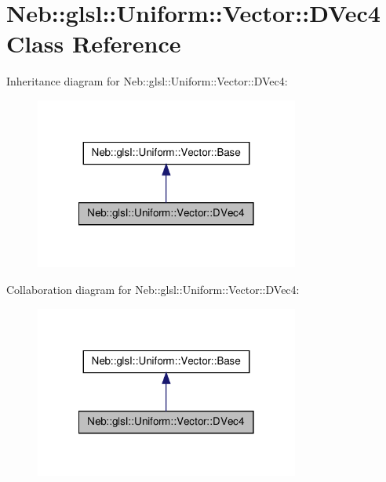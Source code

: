 \hypertarget{classNeb_1_1glsl_1_1Uniform_1_1Vector_1_1DVec4}{\section{\-Neb\-:\-:glsl\-:\-:\-Uniform\-:\-:\-Vector\-:\-:\-D\-Vec4 \-Class \-Reference}
\label{classNeb_1_1glsl_1_1Uniform_1_1Vector_1_1DVec4}
}


\-Inheritance diagram for \-Neb\-:\-:glsl\-:\-:\-Uniform\-:\-:\-Vector\-:\-:\-D\-Vec4\-:\nopagebreak
\begin{figure}[H]
\begin{center}
\leavevmode
\includegraphics[width=246pt]{classNeb_1_1glsl_1_1Uniform_1_1Vector_1_1DVec4__inherit__graph}
\end{center}
\end{figure}


\-Collaboration diagram for \-Neb\-:\-:glsl\-:\-:\-Uniform\-:\-:\-Vector\-:\-:\-D\-Vec4\-:\nopagebreak
\begin{figure}[H]
\begin{center}
\leavevmode
\includegraphics[width=246pt]{classNeb_1_1glsl_1_1Uniform_1_1Vector_1_1DVec4__coll__graph}
\end{center}
\end{figure}
